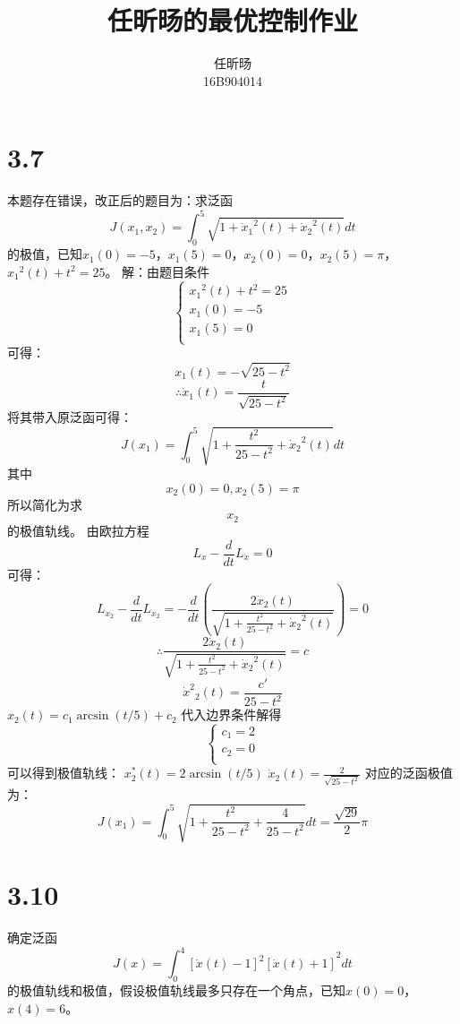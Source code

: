 \documentclass[UTF8]{ctexart}
\title{任昕旸的最优控制作业}
\author{任昕旸\\ 16B904014}
\begin{document}
\maketitle

\section{3.7}
本题存在错误，改正后的题目为：求泛函
\[J({{x}_{1}},{{x}_{2}})=\int_{0}^{5}{\sqrt{1+{{{\dot{x}}}_{1}}^{2}\left( t \right)+{{{\dot{x}}}_{2}}^{2}\left( t \right)}}dt\]
的极值，已知${{x}_{1}}\left( 0 \right)=-5$，${{x}_{1}}\left( 5 \right)=0$，${{x}_{2}}\left( 0 \right)=0$，${{x}_{2}}\left( 5 \right)=\pi $，${{x}_{1}}^{2}\left( t \right)+{{t}^{2}}=25$。
	解：由题目条件
		\[\left\{ \begin{array}{*{35}{l}}
   {{x}_{1}}^{2}\left( t \right)+{{t}^{2}}=25  \\
   {{x}_{1}}\left( 0 \right)=-5  \\
   {{x}_{1}}\left( 5 \right)=0  \\
\end{array} \right.\]
		可得：
		\[{{x}_{1}}\left( t \right)=-\sqrt{25-{{t}^{2}}}\]
\[\therefore {{\dot{x}}_{1}}(t)=\frac{t}{\sqrt{25-{{t}^{2}}}}\]
		将其带入原泛函可得：
\[J({{x}_{1}})=\int_{0}^{5}{\sqrt{1+\frac{{{t}^{2}}}{25-{{t}^{2}}}+{{{\dot{x}}}_{2}}^{2}\left( t \right)}}dt\] 其中\[{{x}_{2}}(0)=0,{{x}_{2}}(5)=\pi \]
所以简化为求\[{{x}_{2}}\]的极值轨线。
由欧拉方程\[{{L}_{x}}-\frac{d}{dt}{{L}_{{\dot{x}}}}=0\]可得：
\[{{L}_{{{x}_{2}}}}-\frac{d}{dt}{{L}_{{{{\dot{x}}}_{2}}}}=-\frac{d}{dt}\left( \frac{2{{{\dot{x}}}_{2}}\left( t \right)}{\sqrt{1+\frac{{{t}^{2}}}{25-{{t}^{2}}}+{{{\dot{x}}}_{2}}^{2}\left( t \right)}} \right)=0\]
		 \[\therefore \frac{2{{{\dot{x}}}_{2}}\left( t \right)}{\sqrt{1+\frac{{{t}^{2}}}{25-{{t}^{2}}}+{{{\dot{x}}}_{2}}^{2}\left( t \right)}}=c\]
		 \[{{\dot{x}}^{2}}_{2}\left( t \right)=\frac{c'}{25-{{t}^{2}}}\]
${{x}_{2}}(t)={{c}_{1}}\arcsin (t/5)+{{c}_{2}}$
代入边界条件解得
\[\left\{ \begin{matrix}
   {{c}_{1}}=2  \\
   {{c}_{2}}=0  \\
\end{matrix} \right.\]
		可以得到极值轨线：
${x}^{*}_{2}(t)=2\arcsin (t/5)$
${{\dot{x}}_{2}}(t)=\frac{2}{\sqrt{25-{{t}^{2}}}}$
对应的泛函极值为：
\[J({{x}_{1}})=\int_{0}^{5}{\sqrt{1+\frac{{{t}^{2}}}{25-{{t}^{2}}}+\frac{4}{25-{{t}^{2}}}}}dt=\frac{\sqrt{29}}{2}\pi \]
\section{3.10}
确定泛函
\[J(x)={\int_{0}^{4}{{{\left[ \dot{x}\left( t \right)-1 \right]}^{2}}\left[ \dot{x}\left( t \right)+1 \right]}^{2}}dt\]
的极值轨线和极值，假设极值轨线最多只存在一个角点，已知$x\left( 0 \right)=0$，$x\left( 4 \right)=6$。
\end{document}
